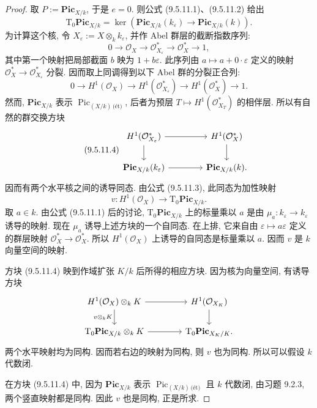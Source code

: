 \begin{proof}
取 $P:=\mathbf{Pic}_{X/k}$, 于是 $e=0$. 则公式 (9.5.11.1)、(9.5.11.2) 给出
\begin{equation}\tag{9.5.11.3}\label{ch09s05:eq9.5.11.3}
 \mathrm T_0\mathbf{Pic}_{X/k}=\ker(\mathbf{Pic}_{X/k}(k_\varepsilon)\longrightarrow\mathbf{Pic}_{X/k}(k)).
\end{equation}
为计算这个核, 令 $X_\varepsilon:=X\otimes_k k_\varepsilon$, 并作 Abel 群层的截断指数序列:
\[
 0\longrightarrow\mathcal O_X\longrightarrow\mathcal O^*_{X_\varepsilon}
 \longrightarrow\mathcal O_X^*\longrightarrow1,
\]
其中第一个映射把局部截面 $b$ 映为 $1+b\varepsilon$. 此序列由 $a\mapsto a+0\cdot\varepsilon$ 定义的映射 $\mathcal O_X^*\to\mathcal O_{X_\varepsilon}^*$ 分裂. 因而取上同调得到以下 Abel 群的分裂正合列:
\[
 0\longrightarrow H^1(\mathcal O_X)\longrightarrow H^1(\mathcal O_{X_\varepsilon}^*)
 \longrightarrow H^1(\mathcal O_X^*)\longrightarrow1.
\]
然而, $\mathbf{Pic}_{X/k}$ 表示 $\operatorname{Pic}_{(X/k)\,\text{(\'{e}t)}}$, 后者为预层 $T\mapsto H^1(\mathcal O_{X_T}^*)$ 的相伴层. 所以有自然的群交换方块
\begin{equation}\tag{9.5.11.4}\label{ch09s05:eq9.5.11.4}
\begin{tikzcd}[column sep=4em]
 H^1(\mathcal O_{X_\varepsilon}^*)\arrow[r]\arrow[d]&H^1(\mathcal O_X^*)\arrow[d]\\
 \mathbf{Pic}_{X/k}(k_\varepsilon)\arrow[r]&\mathbf{Pic}_{X/k}(k).
\end{tikzcd}
\end{equation}
因而有两个水平核之间的诱导同态. 由公式 (9.5.11.3), 此同态为加性映射
\[
 v:H^1(\mathcal O_X)\longrightarrow\mathrm T_0\mathbf{Pic}_{X/k}.
\]
取 $a\in k$. 由公式 (9.5.11.1) 后的讨论, $\mathrm T_0\mathbf{Pic}_{X/k}$ 上的标量乘以 $a$ 是由 $\mu_a:k_\varepsilon\to k_\varepsilon$ 诱导的映射. 现在 $\mu_a$ 诱导上述方块的一个自同态. 在上排, 它来自由 $\varepsilon\mapsto a\varepsilon$ 定义的群层映射 $\mathcal O_X^*\to\mathcal O_X^*$. 所以 $H^1(\mathcal O_X)$ 上诱导的自同态是标量乘以 $a$. 因而 $v$ 是 $k$ 向量空间的映射.

方块 (9.5.11.4) 映到作域扩张 $K/k$ 后所得的相应方块. 因为核为向量空间, 有诱导方块
\[
\begin{tikzcd}[column sep=4em]
 H^1(\mathcal O_X)\otimes_k K\arrow[r]\arrow[d,"v\otimes_k K"']&H^1(\mathcal O_{X_K})\arrow[d]\\
 \mathrm T_0\mathbf{Pic}_{X/k}\otimes_k K\arrow[r]&\mathrm T_0\mathbf{Pic}_{X_K/K}.
\end{tikzcd}
\]
两个水平映射均为同构. 因而若右边的映射为同构, 则 $v$ 也为同构. 所以可以假设 $k$ 代数闭.

在方块 (9.5.11.4) 中, 因为 $\mathbf{Pic}_{X/k}$ 表示 $\operatorname{Pic}_{(X/k)\,\text{(\'{e}t)}}$ 且 $k$ 代数闭, 由习题 9.2.3, 两个竖直映射都是同构. 因此 $v$ 也是同构, 正是所求.
\end{proof}

